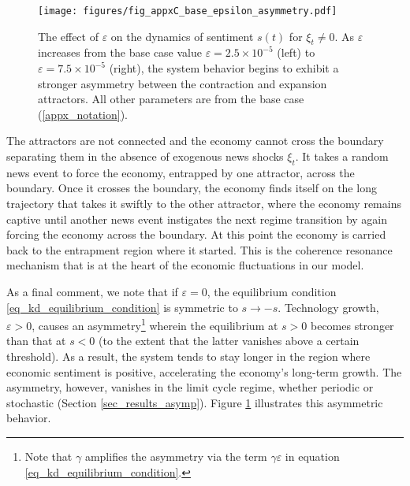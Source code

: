 \begin{figure}
    \centering
    \texttt{[image: figures/fig\_appxC\_base\_epsilon\_asymmetry.pdf]}
    \caption{The effect of $\varepsilon$ on the dynamics of sentiment $s(t)$ for $\xi_t\neq0$. As $\varepsilon$ increases from the base case value $\varepsilon=2.5\times10^{-5}$ (left) to $\varepsilon=7.5\times10^{-5}$ (right), the system behavior begins to exhibit a stronger asymmetry between the contraction and expansion attractors. All other parameters are from the base case (\ref{appx_notation}).}
    \label{fig_appxC_base_epsilon_asymmetry}
\end{figure}

The attractors are not connected and the economy cannot cross the boundary separating them in the absence of exogenous news shocks $\xi_t$. It takes a random news event to force the economy, entrapped by one attractor, across the boundary. Once it crosses the boundary, the economy finds itself on the long trajectory that takes it swiftly to the other attractor, where the economy remains captive until another news event instigates the next regime transition by again forcing the economy across the boundary. At this point the economy is carried back to the entrapment region where it started. This is the coherence resonance mechanism that is at the heart of the economic fluctuations in our model. 

As a final comment, we note that if $\varepsilon=0$, the equilibrium condition \eqref{eq_kd_equilibrium_condition} is symmetric to $s\to -s$. Technology growth, $\varepsilon>0$, causes an asymmetry\footnote{Note that $\gamma$ amplifies the asymmetry via the term $\gamma\varepsilon$ in equation \eqref{eq_kd_equilibrium_condition}.} wherein the equilibrium at $s>0$ becomes stronger than that at $s<0$ (to the extent that the latter vanishes above a certain threshold). As a result, the system tends to stay longer in the region where economic sentiment is positive, accelerating the economy's long-term growth. The asymmetry, however, vanishes in the limit cycle regime, whether periodic or stochastic (Section \ref{sec_results_asymp}). Figure \ref{fig_appxC_base_epsilon_asymmetry} illustrates this asymmetric behavior.  

